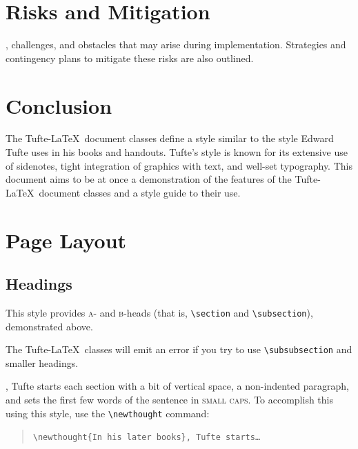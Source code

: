 \documentclass{tufte-handout}
\newcommand{\doccmd}[1]{\texttt{\textbackslash#1}}%
\newenvironment{docspec}{\begin{quote}\noindent}{\end{quote}}%
\begin{document}
\section{Risks and Mitigation}\label{risks-mitigation}
  , challenges, and obstacles that may arise during implementation. Strategies and contingency plans to mitigate these risks are also outlined.

\section{Conclusion}\label{Conclusion}
  \newthought{}





The Tufte-\LaTeX\ document classes define a style similar to the
style Edward Tufte uses in his books and handouts.  Tufte's style is known
for its extensive use of sidenotes, tight integration of graphics with
text, and well-set typography.  This document aims to be at once a
demonstration of the features of the Tufte-\LaTeX\ document classes
and a style guide to their use.

\section{Page Layout}\label{sec:page-layout}
\subsection{Headings}\label{sec:headings}
This style provides \textsc{a}- and \textsc{b}-heads (that is,
\Verb|\section| and \Verb|\subsection|), demonstrated above.

The Tufte-\LaTeX\ classes will emit an error if you try to use
\linebreak\Verb|\subsubsection| and smaller headings.

,\cite{Tufte2006} Tufte
starts each section with a bit of vertical space, a non-indented paragraph,
and sets the first few words of the sentence in \textsc{small caps}.  To
accomplish this using this style, use the \Verb|\newthought| command:  
\begin{docspec}
  \doccmd{newthought\{In his later books\}, Tufte starts\ldots}
\end{docspec}
\end{document}
